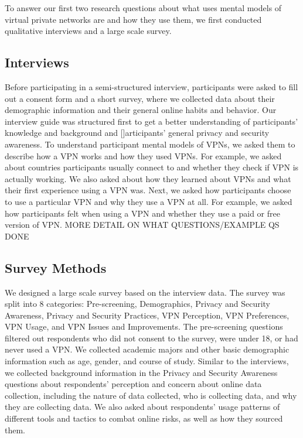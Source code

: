 To answer our first two research questions about  what uses mental models of virtual private networks are and how they use them,  we first conducted qualitative
interviews and a large scale survey. 


\subsection{Interviews} Before participating in a semi-structured interview, participants were asked to fill
out a consent form and a short survey,
where we collected data about their demographic information and their general online habits and behavior. Our interview guide was structured first to get a better understanding of participants' knowledge and background and []articipants' general privacy and security awareness. To understand participant mental models of VPNs, we asked them to describe how a VPN works and how they used VPNs. For example, we asked about countries participants usually connect to and whether they check if VPN is actually working. We also asked about how they learned about VPNs and what their first experience using a VPN was. Next, we asked how participants choose to use a particular VPN and why they use a VPN at all. For example, we asked how participants felt when using a VPN and whether they use a paid or free version of VPN.
 MORE DETAIL ON WHAT QUESTIONS/EXAMPLE QS DONE
 
 \subsection{Survey Methods} 

We designed a large scale survey based on the interview data.  The survey was split into 8 categories: Pre-screening, Demographics, Privacy and
Security Awareness, Privacy and Security Practices, VPN Perception, VPN
Preferences, VPN Usage, and VPN Issues and Improvements. The pre-screening questions
filtered out respondents who did not consent to the survey, were under 18, or
had never used a VPN. We collected academic
majors and other basic demographic information such as age, gender, and course of study. Similar to the interviews, we collected background information in the Privacy and Security Awareness questions about respondents' perception
and concern about online data collection, including the nature of data
collected, who is collecting data, and why they are collecting data. We also asked about respondents' usage patterns
of different tools and tactics to combat online risks, as well as how they
sourced them.

